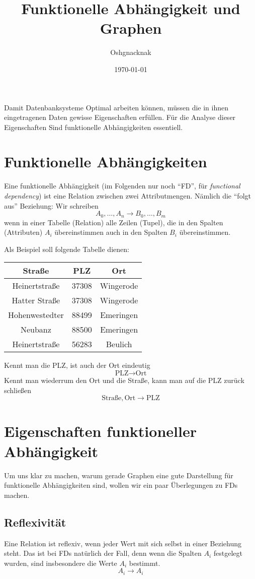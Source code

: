 \documentclass[a4paper, ngerman]{article}
\title{Funktionelle Abhängigkeit und Graphen}
\author{Oshgnacknak}
\date{\today}
\begin{document}
\maketitle

Damit Datenbanksysteme Optimal arbeiten können,
müssen die in ihnen eingetragenen Daten
gewisse Eigenschaften erfüllen.
Für die Analyse dieser Eigenschaften
Sind funktionelle Abhängigkeiten essentiell.

\section*{Funktionelle Abhängigkeiten}
Eine funktionelle Abhängigkeit
(im Folgenden nur noch \enquote{FD}, für \emph{functional dependency})
ist eine Relation zwischen zwei Attributmengen.
Nämlich die \enquote{folgt aus} Beziehung:
Wir schreiben
$$
    A_0, \dots, A_n \to 
    B_0, \dots, B_m
$$
wenn in einer Tabelle (Relation) alle Zeilen (Tupel),
die in den Spalten (Attributen) $A_i$ übereinstimmen
auch in den Spalten $B_i$ übereinstimmen.

Als Beispiel soll folgende Tabelle dienen:
\begin{center}
\begin{tabular}{ c | c | c }
    Straße & PLZ & Ort \\
    \hline
    Heinertstraße & 37308 & Wingerode \\
    Hatter Straße & 37308 & Wingerode \\
    Hohenwestedter & 88499 & Emeringen \\
    Neubanz & 88500 & Emeringen \\
    Heinertstraße & 56283 & Beulich \\
\end{tabular}
\end{center}
Kennt man die PLZ, ist auch der Ort eindeutig
$$
    \text{PLZ} \to \text{Ort}
$$
Kennt man wiederrum den Ort und die Straße,
kann man auf die PLZ zurück schließen
$$
    \text{Straße}, \text{Ort} \to \text{PLZ}
$$

\section*{Eigenschaften funktioneller Abhängigkeit}
Um uns klar zu machen,
warum gerade Graphen eine gute Darstellung für
funktionelle Abhängigkeiten sind,
wollen wir ein paar Überlegungen zu FDs machen.

\subsection*{Reflexivität}
Eine Relation ist reflexiv,
wenn jeder Wert mit sich selbst in einer Beziehung steht.
Das ist bei FDs natürlich der Fall,
denn wenn die Spalten $A_i$ festgelegt wurden,
sind insbesondere die Werte $A_i$ bestimmt.
$$
    A_i \to A_i
$$
\end{document}
